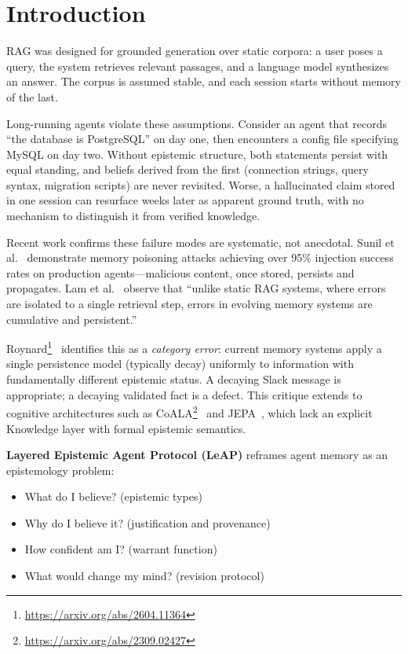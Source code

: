 \documentclass[11pt,letterpaper]{article}
\begin{document}
\section{Introduction}

RAG was designed for grounded generation over static corpora: a user poses a query, the system retrieves relevant passages, and a language model synthesizes an answer. The corpus is assumed stable, and each session starts without memory of the last.

Long-running agents violate these assumptions. Consider an agent that records ``the database is PostgreSQL'' on day one, then encounters a config file specifying MySQL on day two. Without epistemic structure, both statements persist with equal standing, and beliefs derived from the first (connection strings, query syntax, migration scripts) are never revisited. Worse, a hallucinated claim stored in one session can resurface weeks later as apparent ground truth, with no mechanism to distinguish it from verified knowledge.

Recent work confirms these failure modes are systematic, not anecdotal. Sunil et al.~\cite{sunil2026} demonstrate memory poisoning attacks achieving over 95\% injection success rates on production agents---malicious content, once stored, persists and propagates. Lam et al.~\cite{lam2026ssgm} observe that ``unlike static RAG systems, where errors are isolated to a single retrieval step, errors in evolving memory systems are cumulative and persistent.''

Roynard\footnote{\url{https://arxiv.org/abs/2604.11364}}~\cite{roynard2026} identifies this as a \textit{category error}: current memory systems apply a single persistence model (typically decay) uniformly to information with fundamentally different epistemic status. A decaying Slack message is appropriate; a decaying validated fact is a defect. This critique extends to cognitive architectures such as CoALA\footnote{\url{https://arxiv.org/abs/2309.02427}}~\cite{sumers2023coala} and JEPA~\cite{lecun2022path}, which lack an explicit Knowledge layer with formal epistemic semantics.

\textbf{Layered Epistemic Agent Protocol (LeAP)} reframes agent memory as an epistemology problem:
\begin{itemize}[noitemsep]
    \item What do I believe? (epistemic types)
    \item Why do I believe it? (justification and provenance)
    \item How confident am I? (warrant function)
    \item What would change my mind? (revision protocol)
\end{itemize}
\end{document}
